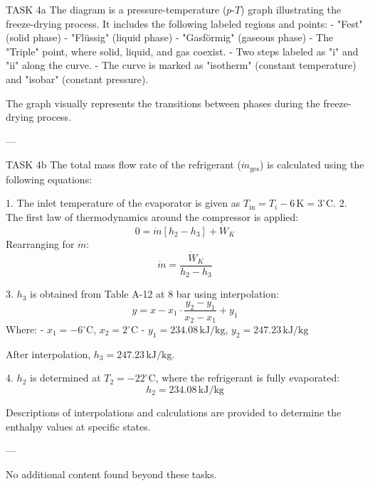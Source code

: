 TASK 4a  
The diagram is a pressure-temperature (\(p\)-\(T\)) graph illustrating the freeze-drying process. It includes the following labeled regions and points:  
- "Fest" (solid phase)  
- "Flüssig" (liquid phase)  
- "Gasförmig" (gaseous phase)  
- The "Triple" point, where solid, liquid, and gas coexist.  
- Two steps labeled as "i" and "ii" along the curve.  
- The curve is marked as "isotherm" (constant temperature) and "isobar" (constant pressure).  

The graph visually represents the transitions between phases during the freeze-drying process.

---

TASK 4b  
The total mass flow rate of the refrigerant (\( \dot{m}_{\text{ges}} \)) is calculated using the following equations:  

1. The inlet temperature of the evaporator is given as \( T_{\text{in}} = T_i - 6 \, \text{K} = 3^\circ \text{C} \).  
2. The first law of thermodynamics around the compressor is applied:  
   \[
   0 = \dot{m} \left[ h_2 - h_3 \right] + \dot{W}_K
   \]  
   Rearranging for \( \dot{m} \):  
   \[
   \dot{m} = \frac{\dot{W}_K}{h_2 - h_3}
   \]  

3. \( h_3 \) is obtained from Table A-12 at 8 bar using interpolation:  
   \[
   y = x - x_1 \cdot \frac{y_2 - y_1}{x_2 - x_1} + y_1
   \]  
   Where:  
   - \( x_1 = -6^\circ \text{C} \), \( x_2 = 2^\circ \text{C} \)  
   - \( y_1 = 234.08 \, \text{kJ/kg} \), \( y_2 = 247.23 \, \text{kJ/kg} \)  

   After interpolation, \( h_3 = 247.23 \, \text{kJ/kg} \).  

4. \( h_2 \) is determined at \( T_2 = -22^\circ \text{C} \), where the refrigerant is fully evaporated:  
   \[
   h_2 = 234.08 \, \text{kJ/kg}
   \]  

Descriptions of interpolations and calculations are provided to determine the enthalpy values at specific states.  

---

No additional content found beyond these tasks.